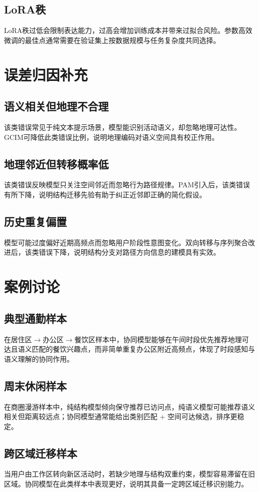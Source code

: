 \subsection{LoRA秩}
LoRA秩过低会限制表达能力，过高会增加训练成本并带来过拟合风险。参数高效微调的最佳点通常需要在验证集上按数据规模与任务复杂度共同选择。

\section{误差归因补充}
\subsection{语义相关但地理不合理}
该类错误常见于纯文本提示场景，模型能识别活动语义，却忽略地理可达性。GCIM可降低此类错误比例，说明地理编码对语义空间具有校正作用。

\subsection{地理邻近但转移概率低}
该类错误反映模型只关注空间邻近而忽略行为路径规律。PAM引入后，该类错误有所下降，说明结构迁移先验有助于纠正近邻即正确的简化假设。

\subsection{历史重复偏置}
模型可能过度偏好近期高频点而忽略用户阶段性意图变化。双向转移与序列聚合改进后，该类错误下降，说明结构分支对路径方向信息的建模具有实效。

\section{案例讨论}
\subsection{典型通勤样本}
在居住区$\rightarrow$办公区$\rightarrow$餐饮区样本中，协同模型能够在午间时段优先推荐地理可达且语义匹配的餐饮兴趣点，而非简单重复办公区附近高频点，体现了时段感知与语义理解的协同作用。

\subsection{周末休闲样本}
在商圈漫游样本中，纯结构模型倾向保守推荐已访问点，纯语义模型可能推荐语义相关但距离较远点；协同模型通常能给出类别匹配 + 空间可达候选，排序更稳定。

\subsection{跨区域迁移样本}
当用户由工作区转向新区活动时，若缺少地理与结构双重约束，模型容易滞留在旧区域。协同模型在此类样本中表现更好，说明其具备一定跨区域迁移识别能力。

